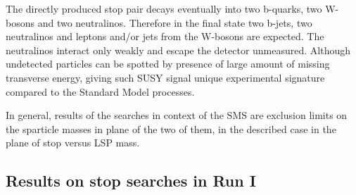 The directly produced stop pair decays eventually into two b-quarks, two W-bosons and two neutralinos. Therefore in the final state two b-jets, two neutralinos and leptons and/or jets from the W-bosons are expected. The neutralinos interact only weakly and escape the detector unmeasured. Although undetected particles can be spotted by presence of large amount of missing transverse energy, giving such SUSY signal unique experimental signature compared to the Standard Model processes.

In general, results of the searches in context of the SMS are exclusion limits on the sparticle masses in plane of the two of them, in the described case in the plane of stop versus LSP mass.





\subsection{Results on stop searches in Run I}


